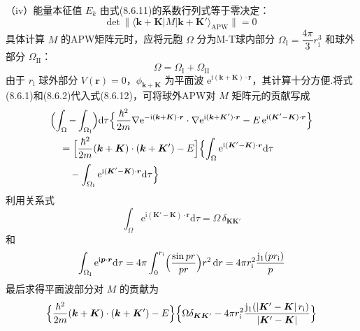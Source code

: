（iv）能量本征值 $E_{k}$ 由式(8.6.11)的系数行列式等于零决定：
\begin{equation}
  \mathrm{det}\,\|\langle\boldsymbol{k}+\boldsymbol{K}|M|\boldsymbol{k}+\boldsymbol{K}'\rangle_{\mathrm{APW}}\|=0
\end{equation}
具体计算 $M$ 的APW矩阵元时，应将元胞 $\Omega$ 分为M-T球内部分 $\Omega_{\mathrm{I}}=\dfrac{4\pi}{3}r_{\mathrm{i}}^{3}$ 和球外部分 $\Omega_{\mathrm{II}}$：
\begin{equation}
  \Omega=\Omega_{\mathrm{I}}+\Omega_{\mathrm{II}}
\end{equation}
由于 $r_{\mathrm{i}}$ 球外部分 $V(\boldsymbol{r})=0$，$\phi_{\boldsymbol{k}+\boldsymbol{K}}$ 为平面波 $\mathrm{e}^{\mathrm{i}(\boldsymbol{k}+\boldsymbol{K})\cdot\boldsymbol{r}}$，其计算十分方便.将式(8.6.1)和(8.6.2)代入式(8.6.12)，可将球外APW对 $M$ 矩阵元的贡献写成
\begin{equation}
\begin{aligned}
  &\Bigl(\int_{\Omega}-\int_{\Omega_{\mathrm{I}}}\Bigr)\mathrm{d}\tau
  \Bigl\{\frac{\hbar^{2}}{2m}\nabla\mathrm{e}^{-\mathrm{i}(\boldsymbol{k}+\boldsymbol{K})\cdot\boldsymbol{r}}\cdot\nabla\mathrm{e}^{\mathrm{i}(\boldsymbol{k}+\boldsymbol{K}')\cdot\boldsymbol{r}}
  -E\,\mathrm{e}^{\mathrm{i}(\boldsymbol{K}'-\boldsymbol{K})\cdot\boldsymbol{r}}\Bigr\}\\
  &\quad=\Bigl[\frac{\hbar^{2}}{2m}(\boldsymbol{k}+\boldsymbol{K})\cdot(\boldsymbol{k}+\boldsymbol{K}')-E\Bigr]
  \Bigl\{\int_{\Omega}\mathrm{e}^{\mathrm{i}(\boldsymbol{K}'-\boldsymbol{K})\cdot\boldsymbol{r}}\mathrm{d}\tau\\
  &\qquad-\int_{\Omega_{\mathrm{I}}}\mathrm{e}^{\mathrm{i}(\boldsymbol{K}'-\boldsymbol{K})\cdot\boldsymbol{r}}\mathrm{d}\tau\Bigr\}
\end{aligned}
\end{equation}
利用关系式
\begin{equation}
  \int_{\Omega}\mathrm{e}^{\mathrm{i}(\boldsymbol{K}'-\boldsymbol{K})\cdot\boldsymbol{r}}\mathrm{d}\tau=\Omega\,\delta_{\boldsymbol{K}\boldsymbol{K}'}
\end{equation}
和
\begin{equation}
  \int_{\Omega_{\mathrm{I}}}\mathrm{e}^{\mathrm{i}\boldsymbol{p}\cdot\boldsymbol{r}}\mathrm{d}\tau
  =4\pi\int_{0}^{r_{\mathrm{i}}}\Bigl(\frac{\sin pr}{pr}\Bigr)r^{2}\,\mathrm{d}r
  =4\pi r_{\mathrm{i}}^{2}\frac{\mathrm{j}_{1}(pr_{\mathrm{i}})}{p}
\end{equation}
最后求得平面波部分对 $M$ 的贡献为
\begin{equation}
  \Bigl\{\frac{\hbar^{2}}{2m}(\boldsymbol{k}+\boldsymbol{K})\cdot(\boldsymbol{k}+\boldsymbol{K}')-E\Bigr\}
  \Bigl\{\Omega\delta_{\boldsymbol{K}\boldsymbol{K}'}
  -4\pi r_{\mathrm{i}}^{2}\frac{\mathrm{j}_{1}(|\boldsymbol{K}'-\boldsymbol{K}|\,r_{\mathrm{i}})}{|\boldsymbol{K}'-\boldsymbol{K}|}\Bigr\}
\end{equation}
